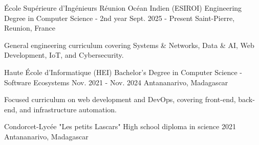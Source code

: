 

\begin{cventries}

  \cventry    
    {\'Ecole Supérieure d'Ingénieurs Réunion Océan Indien (ESIROI)} %
    {Engineering Degree in Computer Science - 2nd year} %
    {Sept. 2025 - Present} %
    {Saint-Pierre, Reunion, France} %
    {
      \begin{cvitems} %
        \item {General engineering curriculum covering Systems \& Networks, Data \& AI, Web Development, IoT, and Cybersecurity.}
      \end{cvitems}
    }

  \cventry
    {Haute \'Ecole d'Informatique (HEI)} %
    {Bachelor's Degree in Computer Science - Software Ecosystems} %
    {Nov. 2021 - Nov. 2024} %
    {Antananarivo, Madagascar} %
    {
      \begin{cvitems} %
        \item {Focused curriculum on web development and DevOps, covering front-end, back-end, and infrastructure automation.}      
      \end{cvitems}
    }


  \cventry
    {Condorcet-Lycée "Les petits Lascars"} %
    {High school diploma in science} %
    {2021} %
    {Antananarivo, Madagascar} %
    {}
\end{cventries}